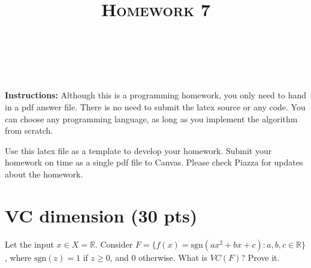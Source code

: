 \documentclass[a4paper]{article}
\title{\textsc{Homework 7}} %
\author{
\red{AKASH SHARMA} \\
\red{9081731771}\\
}
\date{}
\theoremstyle{definition}
\newcommand{\sgn}{\mathrm{sgn}}
\def\R{\mathbb R}
\begin{document}
\maketitle 


\textbf{Instructions:} 
Although this is a programming homework, you only need to hand in a pdf answer file.
There is no need to submit the latex source or any code.
You can choose any programming language, as long as you implement the algorithm from scratch.

Use this latex file as a template to develop your homework.
Submit your homework on time as a single pdf file to Canvas.
Please check Piazza for updates about the homework.


\section{VC dimension (30 pts)}
Let the input $x\in X=\R$.
Consider $F=\{f(x)=\sgn(ax^2+bx+c): a, b, c \in \R\}$, where $\sgn(z)=1$ if $z\ge0$, and 0 otherwise.
What is $VC(F)$?  Prove it.
\end{document}

